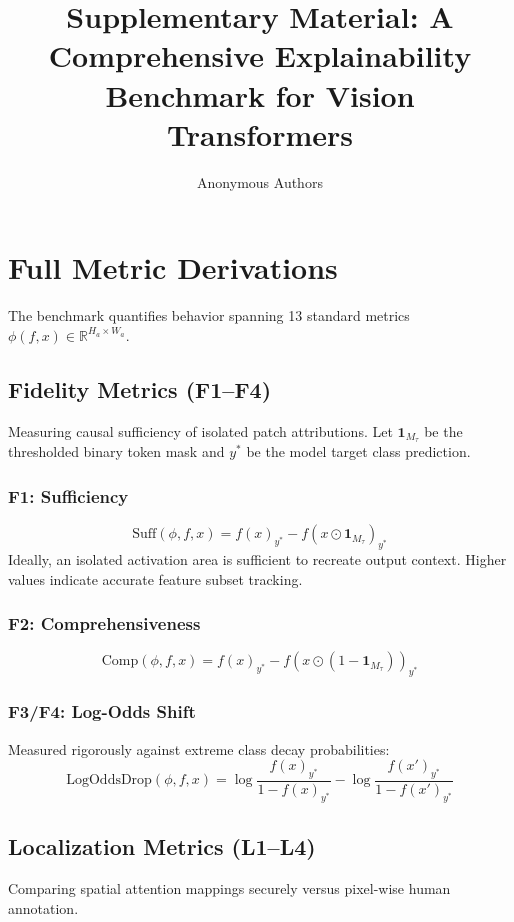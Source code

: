 \documentclass[10pt,journal,compsoc]{IEEEtran}
\begin{document}
\title{Supplementary Material: A Comprehensive Explainability Benchmark for Vision Transformers}
\author{Anonymous Authors}

\maketitle

\section{Full Metric Derivations}

The benchmark quantifies behavior spanning 13 standard metrics $\phi(f, x) \in \mathbb{R}^{H_a \times W_a}$.

\subsection{Fidelity Metrics (F1--F4)}
Measuring causal sufficiency of isolated patch attributions. Let $\mathbf{1}_{M_\tau}$ be the thresholded binary token mask and $y^*$ be the model target class prediction.

\subsubsection{F1: Sufficiency}
\[
\text{Suff}(\phi, f, x) = f(x)_{y^*} - f(x \odot \mathbf{1}_{M_\tau})_{y^*}
\]
Ideally, an isolated activation area is sufficient to recreate output context. Higher values indicate accurate feature subset tracking.

\subsubsection{F2: Comprehensiveness}
\[
\text{Comp}(\phi, f, x) = f(x)_{y^*} - f(x \odot (1 - \mathbf{1}_{M_\tau}))_{y^*}
\]

\subsubsection{F3/F4: Log-Odds Shift}
Measured rigorously against extreme class decay probabilities:
\[
\text{LogOddsDrop}(\phi, f, x) = \log \frac{f(x)_{y^*}}{1 - f(x)_{y^*}} - \log \frac{f(x')_{y^*}}{1 - f(x')_{y^*}}
\]

\subsection{Localization Metrics (L1--L4)}
Comparing spatial attention mappings securely versus pixel-wise human annotation.
\end{document}
